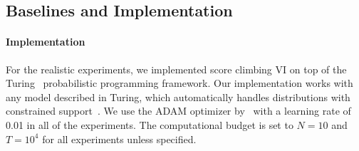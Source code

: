 

\vspace{-0.05in}
\subsection{Baselines and Implementation}
\vspace{-0.05in}
\paragraph{Implementation}
For the realistic experiments, we implemented score climbing VI on top of the Turing~\citep{ge2018t} probabilistic programming framework.
Our implementation works with any model described in Turing, which automatically handles distributions with constrained support~\citep{JMLR:v18:16-107}.
We use the ADAM optimizer by~\citet{kingma_adam_2015} with a learning rate of 0.01 in all of the experiments.
The computational budget is set to \(N=10\) and \(T=10^4\) for all experiments unless specified.

